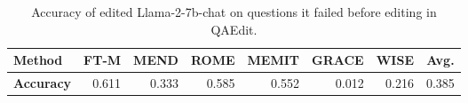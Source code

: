\begin{table}[t]
\centering
\setlength{\tabcolsep}{3.5pt}
\begin{adjustbox}{max width=\linewidth} 
\begin{tabular}{lrrrrrrc}
\toprule
\textbf{Method} & FT-M & MEND & ROME & MEMIT & GRACE & WISE & Avg. \\
\midrule
\textbf{Accuracy} & \num{0.611} & \num{0.333} & \num{0.585} & \num{0.552} & \num{0.012} & \num{0.216} & \num{0.385} \\
\bottomrule 
\end{tabular}
\end{adjustbox}
\caption{Accuracy of edited Llama-2-7b-chat on questions it failed before editing in QAEdit.}
\label{tab:pre_invest}
\end{table}
